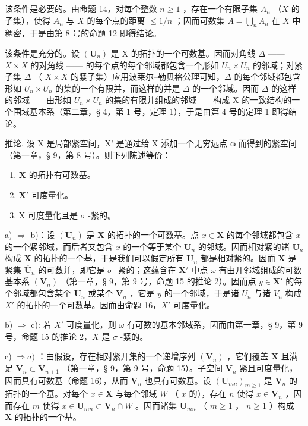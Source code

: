 该条件是必要的。由命题 14，对每个整数 \(n \geqslant 1\) ，存在一个有限子集 \(A_n\) （\(X\) 的子集），使得 \(A_n\) 与 \(X\) 的每个点的距离 \(\leqslant 1/n\) ；因而可数集 \(A = \bigcup_{n} A_n\) 在 \(X\) 中稠密，于是由第 8 号的命题 12 即得结论。

该条件是充分的。设 \((\mathbf{U}_{n})\) 是 X 的拓扑的一个可数基。因而对角线 \(\Delta\) —— \(X \times X\) 的对角线 —— 的每个点的每个邻域都包含一个形如 \(U_{n} \times U_{n}\) 的邻域；对紧子集 \(\Delta\) （ \(X \times X\) 的紧子集）应用波莱尔–勒贝格公理可知，\(\Delta\) 的每个邻域都包含形如 \(U_{n} \times U_{n}\) 的集的一个有限并，而这样的并是 \(\Delta\) 的一个邻域。因而 \(\Delta\) 的这样的邻域——由形如 \(U_{n} \times U_{n}\) 的集的有限并组成的邻域——构成 X 的一致结构的一个围域基本系（第二章，§ 4，第 1 号，定理 1），于是由第 4 号的定理 1 即得结论。

推论. 设 X 是局部紧空间，X' 是通过给 X 添加一个无穷远点 ω 而得到的紧空间（第一章，§ 9，第 8 号）。则下列陈述等价：

\begin{enumerate}
\def\labelenumi{\alph{enumi})}
\item
  \(\mathbf{X}\) 的拓扑有可数基。
\item
  \(\mathbf{X}'\) 可度量化。
\item
  X 可度量化且是 \(\sigma\) -紧的。
\end{enumerate}

a) \(\Longrightarrow\) b)：设 \((\mathbf{U}_n)\) 是 \(\mathbf{X}\) 的拓扑的一个可数基。点 \(x \in \mathbf{X}\) 的每个邻域都包含 \(x\) 的一个紧邻域，而后者又包含 \(x\) 的一个等于某个 \(\mathbf{U}_n\) 的邻域。因而相对紧的诸 \(\mathbf{U}_n\) 构成 \(\mathbf{X}\) 的拓扑的一个基，于是我们可以假定所有 \(\mathbf{U}_n\) 都是相对紧的。因而 \(\mathbf{X}\) 是紧集 \(\overline{\mathbf{U}}_n\) 的可数并，即它是 \(\sigma\) -紧的；这蕴含在 \(\mathbf{X}'\) 中点 \(\omega\) 有由开邻域组成的可数基本系 \((\mathbf{V}_n)\) （第一章，§ 9，第 9 号，命题 15 的推论 2）。因而点 \(y \in \mathbf{X}'\) 的每个邻域都包含某个 \(\mathbf{U}_n\) 或某个 \(\mathbf{V}_n\) ，它是 \(y\) 的一个邻域，于是诸 \(U_{n}\) 与诸 \(V_{n}\) 构成 \(X'\) 的拓扑的一个可数基。因而由命题 16，\(X'\) 可度量化。

b) \(\Longrightarrow\) c): 若 \(X'\) 可度量化，则 \(\omega\) 有可数的基本邻域系，因而由第一章，§ 9，第 9 号，命题 15 的推论 2，\(X\) 是 \(\sigma\) -紧的。

c) \(\Longrightarrow a)\) ：由假设，存在相对紧开集的一个递增序列 \((\mathbf{V}_n)\) ，它们覆盖 \(\mathbf{X}\) 且满足 \(\overline{\mathbf{V}}_n \subset \mathbf{V}_{n+1}\) （第一章，§ 9，第 9 号，命题 15）。子空间 \(\overline{\mathbf{V}}_n\) 紧且可度量化，因而具有可数基（命题 16），从而 \(\mathbf{V}_n\) 也具有可数基。设 \((\mathbf{U}_{mn})_{m \geqslant 1}\) 是 \(\mathbf{V}_n\) 的拓扑的一个基。对每个 \(x \in \mathbf{X}\) 与每个邻域 \(W\) （ \(x\) 的），存在 \(n\) 使得 \(x \in \mathbf{V}_n\) ，因而存在 \(m\) 使得 \(x \in \mathbf{U}_{mn} \subset \mathbf{V}_n \cap W\) 。因而诸集 \(\mathbf{U}_{mn}\) （ \(m \geqslant 1\) ， \(n \geqslant 1\) ）构成 \(\mathbf{X}\) 的拓扑的一个基。
\relax{}
